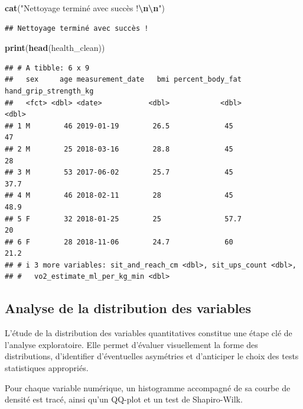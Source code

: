 \documentclass[
]{article}
\newenvironment{Shaded}{\begin{snugshade}}{\end{snugshade}}
\newcommand{\FunctionTok}[1]{\textcolor[rgb]{0.13,0.29,0.53}{\textbf{#1}}}
\newcommand{\NormalTok}[1]{#1}
\newcommand{\SpecialCharTok}[1]{\textcolor[rgb]{0.81,0.36,0.00}{\textbf{#1}}}
\newcommand{\StringTok}[1]{\textcolor[rgb]{0.31,0.60,0.02}{#1}}
\begin{document}
\begin{Shaded}
\begin{Highlighting}[]
\FunctionTok{cat}\NormalTok{(}\StringTok{"Nettoyage terminé avec succès !}\SpecialCharTok{\textbackslash{}n\textbackslash{}n}\StringTok{"}\NormalTok{)}
\end{Highlighting}
\end{Shaded}

\begin{verbatim}
## Nettoyage terminé avec succès !
\end{verbatim}

\begin{Shaded}
\begin{Highlighting}[]
\FunctionTok{print}\NormalTok{(}\FunctionTok{head}\NormalTok{(health\_clean))}
\end{Highlighting}
\end{Shaded}

\begin{verbatim}
## # A tibble: 6 x 9
##   sex     age measurement_date   bmi percent_body_fat hand_grip_strength_kg
##   <fct> <dbl> <date>           <dbl>            <dbl>                 <dbl>
## 1 M        46 2019-01-19        26.5             45                    47  
## 2 M        25 2018-03-16        28.8             45                    28  
## 3 M        53 2017-06-02        25.7             45                    37.7
## 4 M        46 2018-02-11        28               45                    48.9
## 5 F        32 2018-01-25        25               57.7                  20  
## 6 F        28 2018-11-06        24.7             60                    21.2
## # i 3 more variables: sit_and_reach_cm <dbl>, sit_ups_count <dbl>,
## #   vo2_estimate_ml_per_kg_min <dbl>
\end{verbatim}

\subsection{Analyse de la distribution des
variables}\label{analyse-de-la-distribution-des-variables}

L'étude de la distribution des variables quantitatives constitue une
étape clé de l'analyse exploratoire. Elle permet d'évaluer visuellement
la forme des distributions, d'identifier d'éventuelles asymétries et
d'anticiper le choix des tests statistiques appropriés.

Pour chaque variable numérique, un histogramme accompagné de sa courbe
de densité est tracé, ainsi qu'un QQ-plot et un test de Shapiro-Wilk.
\end{document}
